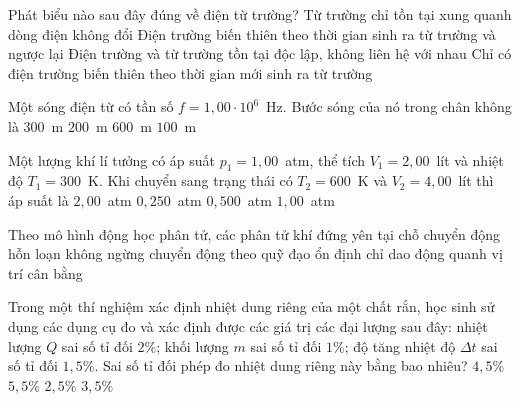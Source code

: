 	\begin{ex}%
		Phát biểu nào sau đây đúng về điện từ trường?
		\choice
		{Từ trường chỉ tồn tại xung quanh dòng điện không đổi}
		{\True Điện trường biến thiên theo thời gian sinh ra từ trường và ngược lại}
		{Điện trường và từ trường tồn tại độc lập, không liên hệ với nhau}
		{Chỉ có điện trường biến thiên theo thời gian mới sinh ra từ trường}
	\end{ex}

	\begin{ex}%
		Một sóng điện từ có tần số $f=1{,}00\cdot 10^6$~Hz. Bước sóng của nó trong chân không là
		\choice
		{\True $300$~m}
		{$200$~m}
		{$600$~m}
		{$100$~m}
	\end{ex}

	\begin{ex}%
		Một lượng khí lí tưởng có áp suất $p_1=1{,}00$~atm, thể tích $V_1=2{,}00$~lít và nhiệt độ $T_1=300$~K. Khi chuyển sang trạng thái có $T_2=600$~K và $V_2=4{,}00$~lít thì áp suất là
		\choice
		{$2{,}00$~atm}
		{$0{,}250$~atm}
		{$0{,}500$~atm}
		{\True $1{,}00$~atm}
	\end{ex}

	\begin{ex}%
		Theo mô hình động học phân tử, các phân tử khí
		\choice
		{đứng yên tại chỗ}
		{\True chuyển động hỗn loạn không ngừng}
		{chuyển động theo quỹ đạo ổn định}
		{chỉ dao động quanh vị trí cân bằng}
	\end{ex}

	\begin{ex}%
		Trong một thí nghiệm xác định nhiệt dung riêng của một chất rắn, học sinh sử dụng các dụng cụ đo và xác định được các giá trị các đại lượng sau đây: nhiệt lượng $Q$ sai số tỉ đối $2\%$; khối lượng $m$ sai số tỉ đối $1\%$; độ tăng nhiệt độ $\Delta t$ sai số tỉ đối $1{,}5\%$. Sai số tỉ đối phép đo nhiệt dung riêng này bằng bao nhiêu?
		\choice
		{\True $4{,}5\%$}
		{$5{,}5\%$}
		{$2{,}5\%$}
		{$3{,}5\%$}
	\end{ex}

